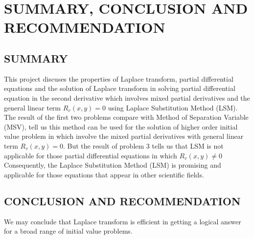 \documentclass[11pt]{report}
\newcommand{\sps}{\\[0.2cm]}
\begin{document}
	\chapter{SUMMARY, CONCLUSION AND RECOMMENDATION}
	\section{SUMMARY}
	This project discuses the properties of Laplace transform, partial differential equations and the solution of Laplace transform in solving partial differential equation in the second derivative which involves mixed partial derivatives and the general linear term $R_v(x,y)=0$ using Laplace Substitution Method (LSM).\sps
	The result of the first  two problems compare with Method of Separation Variable (MSV), tell us this method can be used for the solution of higher order initial value problem in which involve the mixed partial derivatives with general linear term $R_v(x,y)=0$. But the result of problem 3 tells us that LSM is not applicable for those partial differential equations in which $R_v(x,y)\neq 0 $\sps
	Consequently, the Laplace Substitution Method (LSM) is promising and applicable for those equations that appear in other scientific fields. 

	\section{CONCLUSION AND RECOMMENDATION}
	We may conclude that Laplace transform is efficient in getting a logical answer for a broad range of initial value problems.


\end{document}
